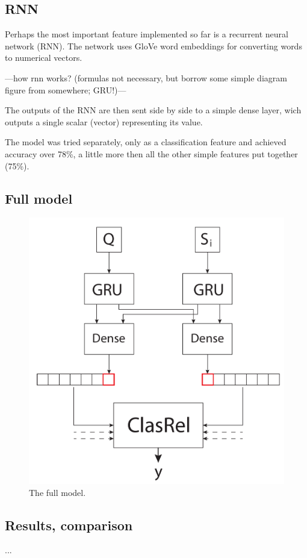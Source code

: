 \documentclass[11pt,a4paper]{article}
\begin{document}
\subsection{RNN}
Perhaps the most important feature implemented so far is a recurrent neural network (RNN). The network uses GloVe word embeddings for converting words to numerical vectors. 

---how rnn works? (formulas not necessary, but borrow some simple diagram figure from somewhere; GRU!)---

The outputs of the RNN are then sent side by side to a simple dense layer, wich outputs a single scalar (vector) representing its value.

The model was tried separately, only as a classification feature and achieved accuracy over 78\%, a little more then all the other simple features put together (75\%).

\subsection{Full model}
\begin{figure}[ht]
	\centering
	\includegraphics[width=15cm]{clasrelfull}
	\caption{The full model.}
	\label{fig:clasrelfull}
\end{figure}
\subsection{Results, comparison}
...









\end{document}
